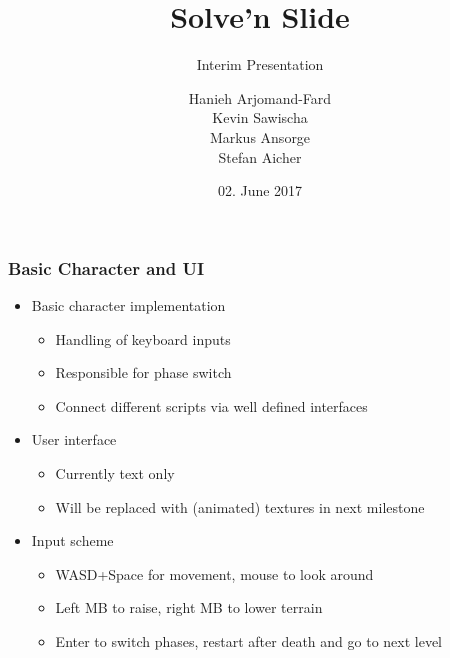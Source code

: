 \documentclass[xcolor=dvipsnames]{beamer}
\title{Solve'n Slide}
\subtitle{Interim Presentation}
\author{Hanieh Arjomand-Fard\\Kevin Sawischa\\Markus Ansorge\\Stefan Aicher}
\date{02. June 2017}
\begin{document}
	\maketitle
	
	\begin{frame}
		\frametitle{Basic Character and UI}
		\begin{itemize}
			\item Basic character implementation
			\begin{itemize}
				\item Handling of keyboard inputs
				\item Responsible for phase switch
				\item Connect different scripts via well defined interfaces
			\end{itemize}
			\item User interface
			\begin{itemize}
				\item Currently text only
				\item Will be replaced with (animated) textures in next milestone
			\end{itemize}
			\item Input scheme
			\begin{itemize}
				\item WASD+Space for movement, mouse to look around
				\item Left MB to raise, right MB to lower terrain
				\item Enter to switch phases, restart after death and go to next level
			\end{itemize}
		\end{itemize}
	\end{frame}
	
\end{document}
